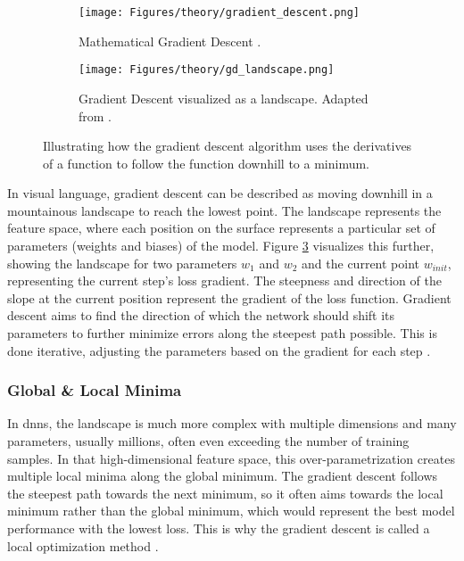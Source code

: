 \begin{figure}[htb]
    \centering
    \begin{subfigure}{0.73\textwidth}
        \centering
        \texttt{[image: Figures/theory/gradient\_descent.png]}
        \caption{Mathematical Gradient Descent \autocite{Goodfellow.Bengio.ea2016}.}
        \label{fig:gd}
    \end{subfigure}
    \begin{subfigure}{0.25\textwidth}
        \centering
        \texttt{[image: Figures/theory/gd\_landscape.png]}
        \caption{Gradient Descent visualized as a landscape. Adapted from \textcite{Bernard2021}.}
        \label{fig:gd_landscape}
    \end{subfigure}
    \caption[Gradient Descent]{Illustrating how the gradient descent algorithm uses the derivatives of a function to follow the function downhill to a minimum.}
\end{figure}

In visual language, gradient descent can be described as moving downhill in a mountainous landscape to reach the lowest point. The landscape represents the feature space, where each position on the surface represents a particular set of parameters (weights and biases) of the model. Figure \ref{fig:gd_landscape} visualizes this further, showing the landscape for two parameters \( w_1 \) and \( w_2 \) and the current point \( w_{init} \), representing the current step's loss gradient. The steepness and direction of the slope at the current position represent the gradient of the loss function. Gradient descent aims to find the direction of which the network should shift its parameters to further minimize errors along the steepest path possible. This is done iterative, adjusting the parameters based on the gradient for each step \autocite{Bernard2021,Goodfellow.Bengio.ea2016,Nielsen2015,Szeliski2022}.

\subsubsection*{Global \& Local Minima}

In \glspl{dnn}, the landscape is much more complex with multiple dimensions and many parameters, usually millions, often even exceeding the number of training samples. In that high-dimensional feature space, this over-parametrization creates multiple local minima along the global minimum. The gradient descent follows the steepest path towards the next minimum, so it often aims towards the local minimum rather than the global minimum, which would represent the best model performance with the lowest loss. This is why the gradient descent is called a local optimization method \autocite{Bernard2021,Szeliski2022}.

